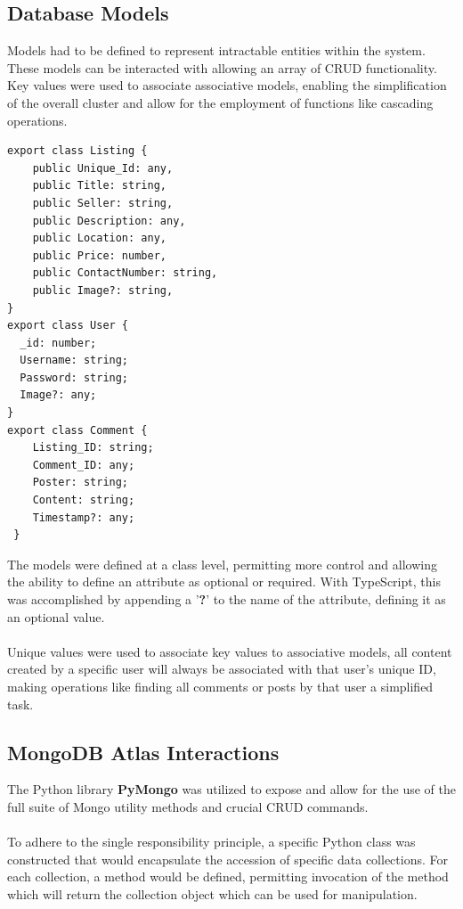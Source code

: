 \subsection{Database Models}
Models had to be defined to represent intractable entities within the system. These models can be interacted with allowing an array of CRUD functionality. Key values were used to associate associative models, enabling the simplification of the overall cluster and allow for the employment of functions like cascading operations.

\begin{lstlisting}[caption=Definiton of Database Models]
export class Listing { 
    public Unique_Id: any,
    public Title: string,
    public Seller: string,
    public Description: any,
    public Location: any,
    public Price: number,
    public ContactNumber: string,
    public Image?: string,
}
export class User { 
  _id: number;
  Username: string;
  Password: string;
  Image?: any;
}
export class Comment { 
    Listing_ID: string;
    Comment_ID: any;
    Poster: string;
    Content: string;
    Timestamp?: any;
 }
\end{lstlisting}

The models were defined at a class level, permitting more control and allowing the ability to define an attribute as optional or required. With TypeScript, this was accomplished by appending a '\textbf{?}' to the name of the attribute, defining it as an optional value.

\paragraph{}
Unique values were used to associate key values to associative models, all content created by a specific user will always be associated with that user's unique ID, making operations like finding all comments or posts by that user a simplified task.

\subsection{MongoDB Atlas Interactions}
The Python library \textbf{PyMongo} was utilized to expose and allow for the use of the full suite of Mongo utility methods and crucial CRUD commands. 

\paragraph{}
To adhere to the single responsibility principle, a specific Python class was constructed that would encapsulate the accession of specific data collections. For each collection, a method would be defined, permitting invocation of the method which will return the collection object which can be used for manipulation. \newline

